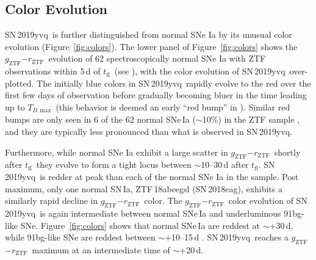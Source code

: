 \documentclass[twocolumn]{aastex63}
\newcommand{\rztf}{$r_\mathrm{ZTF}$}
\newcommand{\gztf}{$g_\mathrm{ZTF}$}
\newcommand{\tfl}{$t_\mathrm{fl}$}
\newcommand{\tbmax}{$T_{B,\mathrm{max}}$}
\newcommand{\sn}{SN\,2019yvq}
\begin{document}
\subsection{Color Evolution}

\sn\ is further distinguished from normal SNe Ia by its unusual color
evolution (Figure~\ref{fig:colors}). The lower panel of
Figure~\ref{fig:colors} shows the \gztf$ - $\rztf\ evolution of 62
spectroscopically normal SNe Ia with ZTF observations within 5\,d of \tfl\
(see \citealt{Bulla20}), with the color evolution of \sn\ over-plotted. The
initially blue colors in \sn\ rapidly evolve to the red over the first few
days of observation before gradually becoming bluer in the time leading up to
\tbmax\ (this behavior is deemed an early ``red bump'' in \citealt{Bulla20}).
Similar red bumps are only seen in 6 of the 62 normal SNe\,Ia ($\sim$10\%) in
the ZTF sample \citep{Bulla20}, and they are typically less pronounced than
what is observed in \sn.

Furthermore, while normal SNe Ia exhibit a large scatter in
\gztf$ - $\rztf\ shortly after \tfl\ they evolve to form a tight locus between
$\sim$10--30\,d after \tfl. \sn\ is redder at peak than each of the normal SNe
Ia in the \citet{Bulla20} sample. Post maximum, only one normal SN\,Ia,
ZTF\,18abeegsl (SN\,2018eag), exhibits a similarly rapid decline in \gztf$ -
$\rztf\ color. The \gztf$ - $\rztf\ color evolution of \sn\ is again
intermediate between normal SNe\,Ia and underluminous 91bg-like SNe.
Figure~\ref{fig:colors} shows that normal SNe\,Ia are reddest at $\sim$+30\,d,
while 91bg-like SNe are reddest between $\sim$+10--15\,d \citep{Burns14}. \sn\
reaches a \gztf$-$\rztf\ maximum at an intermediate time of $\sim$+20\,d.
\end{document}
